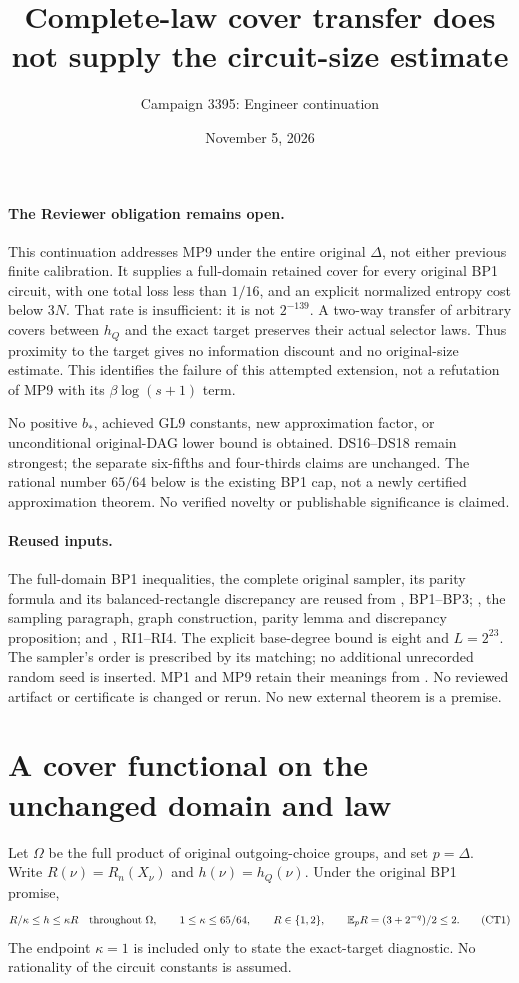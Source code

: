 \documentclass[11pt]{article}
\title{Complete-law cover transfer does not supply the circuit-size estimate}
\author{Campaign 3395: Engineer continuation}
\date{November 5, 2026}
\newcommand{\E}{\mathbb E}
\begin{document}
\maketitle

\paragraph{The Reviewer obligation remains open.}
This continuation addresses MP9 under the entire original $\Delta$,
not either previous finite calibration. It supplies a full-domain
retained cover for every original BP1 circuit, with one total loss
less than $1/16$, and an explicit normalized entropy cost below $3N$.
That rate is insufficient: it is not $2^{-139}$.
A two-way transfer of arbitrary covers between $h_Q$ and the exact
target preserves their actual selector laws. Thus proximity to the
target gives no information discount and no original-size estimate.
This identifies the failure of this attempted extension, not a
refutation of MP9 with its $\beta\log(s+1)$ term.

No positive $b_*$, achieved GL9 constants, new approximation factor,
or unconditional original-DAG lower bound is obtained. DS16--DS18
remain strongest; the separate six-fifths and four-thirds claims
are unchanged. The rational number $65/64$ below is the existing
BP1 cap, not a newly certified approximation theorem.
No verified novelty or publishable significance is claimed.

\paragraph{Reused inputs.}
The full-domain BP1 inequalities, the complete original sampler,
its parity formula and its balanced-rectangle discrepancy are
reused from , BP1--BP3;
, the sampling
paragraph, graph construction, parity lemma and discrepancy
proposition; and ,
RI1--RI4. The explicit base-degree bound is eight and $L=2^{23}$.
The sampler's order is prescribed by its matching; no additional
unrecorded random seed is inserted.
MP1 and MP9 retain their meanings from
. No reviewed artifact or
certificate is changed or rerun. No new external theorem is a premise.

\section{A cover functional on the unchanged domain and law}
Let $\Omega$ be the full product of original outgoing-choice groups,
and set $p=\Delta$. Write $R(\nu)=R_n(X_\nu)$ and
$h(\nu)=h_Q(\nu)$. Under the original BP1 promise,
\[
 R/\kappa\le h\le\kappa R\quad\hbox{throughout }\Omega,\qquad
 1\le\kappa\le65/64,\qquad
 R\in\{1,2\},\qquad \E_pR=(3+2^{-q})/2\le2 .
                                                        \tag{CT1}
\]
The endpoint $\kappa=1$ is included only to state the exact-target
diagnostic. No rationality of the circuit constants is assumed.
\end{document}
